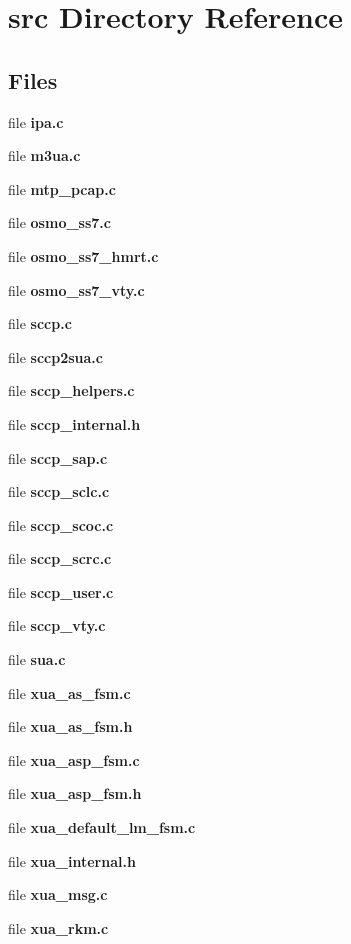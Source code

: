 \section{src Directory Reference}
\label{dir_68267d1309a1af8e8297ef4c3efbcdba}
\subsection*{Files}
\begin{DoxyCompactItemize}
\item 
file {\bf ipa.\+c}
\item 
file {\bf m3ua.\+c}
\item 
file {\bf mtp\+\_\+pcap.\+c}
\item 
file {\bf osmo\+\_\+ss7.\+c}
\item 
file {\bf osmo\+\_\+ss7\+\_\+hmrt.\+c}
\item 
file {\bf osmo\+\_\+ss7\+\_\+vty.\+c}
\item 
file {\bf sccp.\+c}
\item 
file {\bf sccp2sua.\+c}
\item 
file {\bf sccp\+\_\+helpers.\+c}
\item 
file {\bf sccp\+\_\+internal.\+h}
\item 
file {\bf sccp\+\_\+sap.\+c}
\item 
file {\bf sccp\+\_\+sclc.\+c}
\item 
file {\bf sccp\+\_\+scoc.\+c}
\item 
file {\bf sccp\+\_\+scrc.\+c}
\item 
file {\bf sccp\+\_\+user.\+c}
\item 
file {\bf sccp\+\_\+vty.\+c}
\item 
file {\bf sua.\+c}
\item 
file {\bf xua\+\_\+as\+\_\+fsm.\+c}
\item 
file {\bf xua\+\_\+as\+\_\+fsm.\+h}
\item 
file {\bf xua\+\_\+asp\+\_\+fsm.\+c}
\item 
file {\bf xua\+\_\+asp\+\_\+fsm.\+h}
\item 
file {\bf xua\+\_\+default\+\_\+lm\+\_\+fsm.\+c}
\item 
file {\bf xua\+\_\+internal.\+h}
\item 
file {\bf xua\+\_\+msg.\+c}
\item 
file {\bf xua\+\_\+rkm.\+c}
\end{DoxyCompactItemize}
